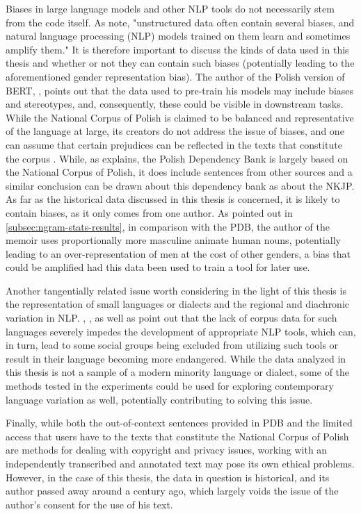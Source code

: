 Biases in large language models and other NLP tools do not necessarily stem from the code itself. As \citet{garimella-etal-2021-intelligent} note, "unstructured data often contain several biases, and natural language processing (NLP) models trained on them learn and sometimes amplify them." It is therefore important to discuss the kinds of data used in this thesis and whether or not they can contain such biases (potentially leading to the aforementioned gender representation bias). The author of the Polish version of BERT, \citet{kłeczek_2021}, points out that the data used to pre-train his models may include biases and stereotypes, and, consequently, these could be visible in downstream tasks. While the National Corpus of Polish is claimed to be balanced and representative of the language at large, its creators do not address the issue of biases, and one can assume that certain prejudices can be reflected in the texts that constitute the corpus \citep{nkjp}. While, as \citet{wroblewska-2018-extended} explains, the Polish Dependency Bank is largely based on the National Corpus of Polish, it does include sentences from other sources and a similar conclusion can be drawn about this dependency bank as about the NKJP. As far as the historical data discussed in this thesis is concerned, it is likely to contain biases, as it only comes from one author. As pointed out in \autoref{subsec:ngram-stats-results}, in comparison with the PDB, the author of the memoir uses proportionally more masculine animate human nouns, potentially leading to an over-representation of men at the cost of other genders, a bias that could be amplified had this data been used to train a tool for later use.  

Another tangentially related issue worth considering in the light of this thesis is the representation of small languages or dialects and the regional and diachronic variation in NLP. \citet{mcenery-etal-2000-corpus}, \citet{soria-etal-2016-fostering}, as well as  \citet{hovy-2018-social} point out that the lack of corpus data for such languages severely impedes the development of appropriate NLP tools, which can, in turn, lead to some social groups being excluded from utilizing such tools or result in their language becoming more endangered. While the data analyzed in this thesis is not a sample of a modern minority language or dialect, some of the methods tested in the experiments could be used for exploring contemporary language variation as well, potentially contributing to solving this issue. 

Finally, while both the out-of-context sentences provided in PDB and the limited access that users have to the texts that constitute the National Corpus of Polish are methods for dealing with copyright and privacy issues, working with an independently transcribed and annotated text may pose its own ethical problems. However, in the case of this thesis, the data in question is historical, and its author passed away around a century ago, which largely voids the issue of the author's consent for the use of his text. 